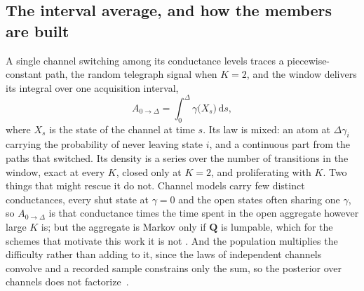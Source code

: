 \begin{appendixbox}
\subsection*{The interval average, and how the members are built}

A single channel switching among its conductance levels traces a piecewise-constant path, the
random telegraph signal when $K=2$, and the window delivers its integral over one acquisition
interval,
\begin{equation}
  A_{0\to\Delta}=\int_0^{\Delta}\gamma\bigl(X_s\bigr)\,\mathrm{d}s,
  \label{eq:integrated-conductance}
\end{equation}
where $X_s$ is the state of the channel at time $s$. Its law is mixed: an atom at
$\Delta\gamma_i$ carrying the probability of never leaving state $i$, and a continuous part from
the paths that switched. Its density is a series over the number of transitions in the window,
exact at every $K$, closed only at $K=2$, and proliferating with $K$. Two things that might
rescue it do not. Channel models carry few distinct conductances, every shut state at
$\gamma=0$ and the open states often sharing one $\gamma$, so $A_{0\to\Delta}$ is that
conductance times the time spent in the open aggregate however large $K$ is; but the aggregate is
Markov only if $\mathbf{Q}$ is lumpable, which for the schemes that motivate this work it is not
\citep{colquhoun1981stochastic}. And the population multiplies the difficulty rather than adding
to it, since the laws of independent channels convolve and a recorded sample constrains only the
sum, so the posterior over channels does not factorize~\citep{moffatt2007estimation}.


\end{appendixbox}
